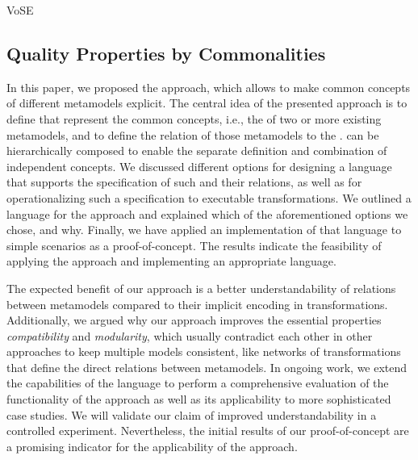 \begin{copiedFrom}{VoSE}

\subsection{Quality Properties by Commonalities}

In this paper, we proposed the \commonalities approach, which allows to make common concepts of different metamodels explicit.
The central idea of the presented approach 
is to define \emph{\conceptmetamodels} that represent the common concepts, i.e., the \commonalities of two or more existing metamodels, and to define the relation of those metamodels to the \conceptmetamodels.
\Conceptmetamodels can be hierarchically composed to enable the separate definition and combination of independent concepts.
We discussed different options for designing a language that supports the specification of such \commonalities and their relations, 
as well as for operationalizing such a specification to executable transformations.
We outlined a language for the \commonalities approach and explained %
which of the aforementioned options we chose, and why.
Finally, we have applied an implementation of that language to simple scenarios as a proof-of-concept.
The results indicate the feasibility of applying the \commonalities approach and implementing an appropriate language.

The expected benefit of our approach is a better understandability of relations between metamodels compared to their implicit encoding in transformations.
Additionally, we argued why our approach improves the essential properties \emph{compatibility} and \emph{modularity}, which usually contradict each other in other approaches to keep multiple models consistent, like networks of transformations that define the direct relations between metamodels.
In ongoing work, we extend the capabilities of the language to perform a comprehensive evaluation of the functionality of the approach as well as its applicability to more sophisticated case studies.
We will validate our claim of improved understandability in a controlled experiment.
Nevertheless, the initial results of our proof-of-concept are a promising indicator for the applicability of the \commonalities approach.

\end{copiedFrom} %

